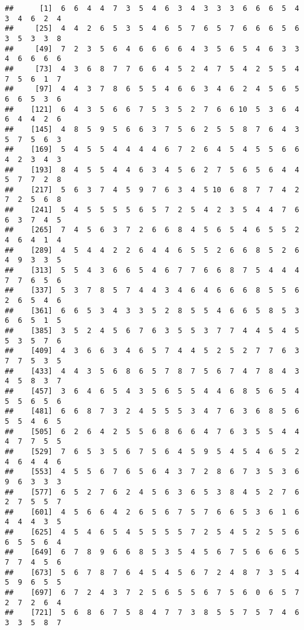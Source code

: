 \documentclass[
]{book}
\begin{document}
\begin{verbatim}
##      [1]  6  6  4  4  7  3  5  4  6  3  4  3  3  3  6  6  6  5  4  3  4  6  2  4
##     [25]  4  4  2  6  5  3  5  4  6  5  7  6  5  7  6  6  6  5  6  3  5  3  3  8
##     [49]  7  2  3  5  6  4  6  6  6  6  4  3  5  6  5  4  6  3  3  4  6  6  6  6
##     [73]  4  3  6  8  7  7  6  6  4  5  2  4  7  5  4  2  5  5  4  7  5  6  1  7
##     [97]  4  4  3  7  8  6  5  5  4  6  6  3  4  6  2  4  5  6  5  6  6  5  3  6
##    [121]  6  4  3  5  6  6  7  5  3  5  2  7  6  6 10  5  3  6  4  6  4  4  2  6
##    [145]  4  8  5  9  5  6  6  3  7  5  6  2  5  5  8  7  6  4  3  5  7  5  6  3
##    [169]  5  4  5  5  4  4  4  4  6  7  2  6  4  5  4  5  5  6  6  4  2  3  4  3
##    [193]  8  4  5  5  4  4  6  3  4  5  6  2  7  5  6  5  6  4  4  5  7  7  2  8
##    [217]  5  6  3  7  4  5  9  7  6  3  4  5 10  6  8  7  7  4  2  7  2  5  6  8
##    [241]  5  4  5  5  5  5  6  5  7  2  5  4  2  3  5  4  4  7  6  6  3  7  4  5
##    [265]  7  4  5  6  3  7  2  6  6  8  4  5  6  5  4  6  5  5  2  4  6  4  1  4
##    [289]  4  5  4  4  2  2  6  4  4  6  5  5  2  6  6  8  5  2  6  4  9  3  3  5
##    [313]  5  5  4  3  6  6  5  4  6  7  7  6  6  8  7  5  4  4  4  7  7  6  5  6
##    [337]  5  3  7  8  5  7  4  4  3  4  6  4  6  6  6  8  5  5  6  2  6  5  4  6
##    [361]  6  6  5  3  4  3  3  5  2  8  5  5  4  6  6  5  8  5  3  6  6  5  1  5
##    [385]  3  5  2  4  5  6  7  6  3  5  5  3  7  7  4  4  5  4  5  5  3  5  7  6
##    [409]  4  3  6  6  3  4  6  5  7  4  4  5  2  5  2  7  7  6  3  7  7  5  3  5
##    [433]  4  4  3  5  6  8  6  5  7  8  7  5  6  7  4  7  8  4  3  4  5  8  3  7
##    [457]  3  6  4  6  5  4  3  5  6  5  5  4  4  6  8  5  6  5  4  5  5  6  5  6
##    [481]  6  6  8  7  3  2  4  5  5  5  3  4  7  6  3  6  8  5  6  5  5  4  6  5
##    [505]  6  2  6  4  2  5  5  6  8  6  6  4  7  6  3  5  5  4  4  4  7  7  5  5
##    [529]  7  6  5  3  5  6  7  5  6  4  5  9  5  4  5  4  6  5  2  4  6  4  4  6
##    [553]  4  5  5  6  7  6  5  6  4  3  7  2  8  6  7  3  5  3  6  9  6  3  3  3
##    [577]  6  5  2  7  6  2  4  5  6  3  6  5  3  8  4  5  2  7  6  2  7  5  5  7
##    [601]  4  5  6  6  4  2  6  5  6  7  5  7  6  6  5  3  6  1  6  4  4  4  3  5
##    [625]  4  5  4  6  5  4  5  5  5  5  7  2  5  4  5  2  5  5  6  6  5  5  6  4
##    [649]  6  7  8  9  6  6  8  5  3  5  4  5  6  7  5  6  6  6  5  7  7  4  5  6
##    [673]  5  6  7  8  7  6  4  5  4  5  6  7  2  4  8  7  3  5  4  5  9  6  5  5
##    [697]  6  7  2  4  3  7  2  5  6  5  5  6  7  5  6  0  6  5  7  2  7  2  6  4
##    [721]  5  6  8  6  7  5  8  4  7  7  3  8  5  5  7  5  7  4  6  3  3  5  8  7

\end{verbatim}
\end{document}
